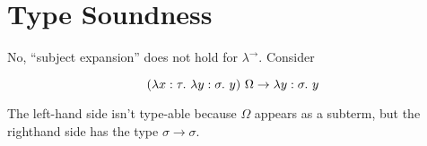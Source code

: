 \section{Type Soundness}
No, ``subject expansion'' does not hold for $\lambda^{\rightarrow}$. Consider

$$ (\lambda x:\tau.~\lambda y:\sigma.~y)~\Omega \rightarrow \lambda y:\sigma.~y $$

The left-hand side isn't type-able because $\Omega$ appears as a subterm, but
the righthand side has the type $\sigma \rightarrow \sigma$.
